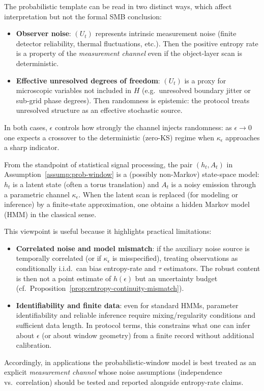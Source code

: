 \begin{remark}\label{rem:randomness-interpretation}
The probabilistic template can be read in two distinct ways, which affect interpretation but not the formal SMB conclusion:
\begin{itemize}[leftmargin=*,itemsep=2pt]
  \item \textbf{Observer noise}: $(U_t)$ represents intrinsic measurement noise (finite detector reliability, thermal fluctuations, etc.). Then the positive entropy rate is a property of the \emph{measurement channel} even if the object-layer scan is deterministic.
  \item \textbf{Effective unresolved degrees of freedom}: $(U_t)$ is a proxy for microscopic variables not included in $H$ (e.g.\ unresolved boundary jitter or sub-grid phase degrees). Then randomness is epistemic: the protocol treats unresolved structure as an effective stochastic source.
\end{itemize}
In both cases, $\epsilon$ controls how strongly the channel injects randomness: as $\epsilon\to 0$ one expects a crossover to the deterministic (zero-KS) regime when $\kappa_\epsilon$ approaches a sharp indicator.
\end{remark}

\begin{remark}\label{rem:hmm-connection}
From the standpoint of statistical signal processing, the pair $(h_t,A_t)$ in Assumption~\ref{assump:prob-window} is a (possibly non-Markov) state-space model: $h_t$ is a latent state (often a torus translation) and $A_t$ is a noisy emission through a parametric channel $\kappa_\epsilon$. When the latent scan is replaced (for modeling or inference) by a finite-state approximation, one obtains a hidden Markov model (HMM) in the classical sense.\cite{Rabiner1989HMMTutorial,CappeMoulinesRyden2005HMM}

This viewpoint is useful because it highlights practical limitations:
\begin{itemize}[leftmargin=*,itemsep=2pt]
  \item \textbf{Correlated noise and model mismatch}: if the auxiliary noise source is temporally correlated (or if $\kappa_\epsilon$ is misspecified), treating observations as conditionally i.i.d.\ can bias entropy-rate and $\tau$ estimators. The robust content is then not a point estimate of $h(\epsilon)$ but an uncertainty budget (cf.\ Proposition~\ref{prop:entropy-continuity-mismatch}).
  \item \textbf{Identifiability and finite data}: even for standard HMMs, parameter identifiability and reliable inference require mixing/regularity conditions and sufficient data length. In protocol terms, this constrains what one can infer about $\epsilon$ (or about window geometry) from a finite record without additional calibration.
\end{itemize}
Accordingly, in applications the probabilistic-window model is best treated as an explicit \emph{measurement channel} whose noise assumptions (independence vs.\ correlation) should be tested and reported alongside entropy-rate claims.
\end{remark}

